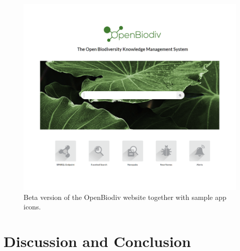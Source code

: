 \begin{figure}
\centering
\includegraphics[width=\textwidth]{Figures/openbiodiv-webpage}
\decoRule
\caption[OpenBiodiv Website]{Beta version of the OpenBiodiv website together with sample app icons.}
\label{fig:website}
\end{figure}

\section{Discussion and Conclusion}

